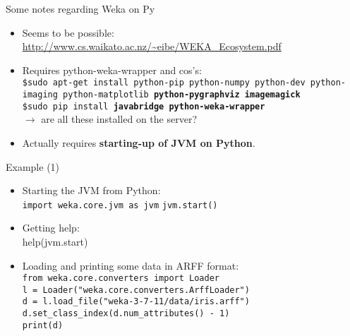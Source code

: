 \documentclass[pdf]
{beamer}
\begin{document}
\begin{frame}{Some notes regarding Weka on Py}
	\begin{itemize}
		\item Seems to be possible: \href{http://www.cs.waikato.ac.nz/~eibe/WEKA_Ecosystem.pdf}{http://www.cs.waikato.ac.nz/\textasciitilde eibe/WEKA\_Ecosystem.pdf}
		\item Requires python-weka-wrapper and cos's:\\
		\texttt{\$sudo apt-get install python-pip python-numpy python-dev python-imaging python-matplotlib \textbf{python-pygraphviz} \textbf{imagemagick}} \\
		\texttt{\$sudo pip install \textbf{javabridge} \textbf{python-weka-wrapper}}\\
		$\rightarrow$ are all these installed on the server?
		\item Actually  requires \textbf{starting-up of JVM on Python}.
	\end{itemize}
\end{frame}

\begin{frame}{Example (1)}
	\begin{itemize}
		\item Starting the JVM from Python:\\
			\texttt{import weka.core.jvm as jvm}
			\texttt{jvm.start()}
		\item Getting help:\\
			help(jvm.start)
		\item Loading and printing some data in ARFF format:\\
			\texttt{from weka.core.converters import Loader}\\
			\texttt{l = Loader("weka.core.converters.ArffLoader")}\\
			\texttt{d = l.load\_file("weka-3-7-11/data/iris.arff")}\\
			\texttt{d.set\_class\_index(d.num\_attributes() - 1)}\\
			\texttt{print(d)}
	\end{itemize}
\end{frame}
\end{document}

